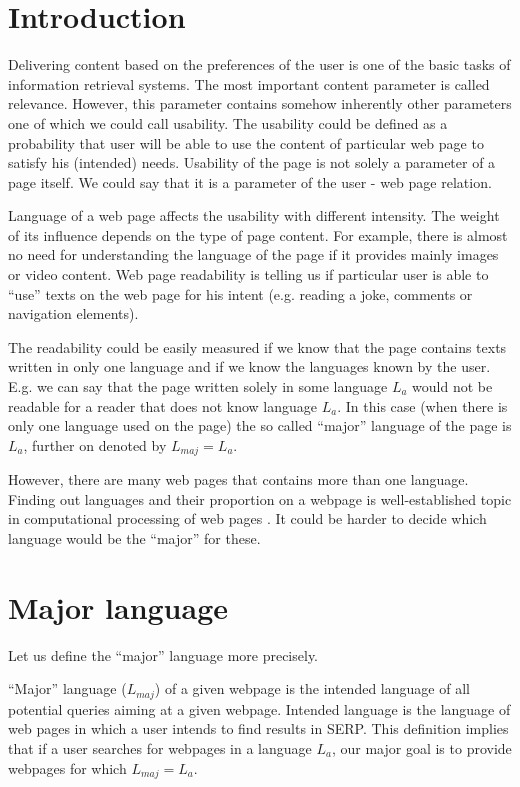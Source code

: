 \documentclass{acm_proc_article-sp}
\begin{document}
\section{Introduction}
  Delivering content based on the preferences of the user is one of the basic tasks of information retrieval systems.
  The most important content parameter is called relevance. 
  However, this parameter contains somehow inherently other parameters one of which we could call usability.
  The usability could be defined as a probability that user will be able to use the content of particular 
  web page to satisfy his (intended) needs.
  Usability of the page is not solely a parameter of a page itself.
  We could say that it is a parameter of the user - web page relation.

  Language of a web page affects the usability with different intensity. 
  The weight of its influence depends on the type of page content.
  For example, there is almost no need for understanding the language of the page if it provides mainly images or video content.
  Web page readability is telling us if particular user is able to
  ``use'' texts on the web page for his intent (e.g. reading a joke, comments or navigation elements).
 

  The readability could be easily measured if we know that the page contains texts written in only one language 
  and if we know the languages known by the user.
  E.g. we can say that the page written solely in some language $L_a$ would not be readable for a reader 
  that does not know language $L_a$. 
  In this case (when there is only one language used on the page) 
  the so called ``major'' language of the page is $L_a$, further on denoted by $L_{maj} = L_a$.
  
  However, there are many web pages that contains more than one language.
  Finding out languages and their proportion on a webpage is well-established topic in computational processing of 
  web pages \cite{ Baldwin:shortlong, Campbell:supportvector, trenkle:ngram, Martins:langidentweb, Rehurek:languageidentification}.
  It could be harder to decide which language would be the ``major'' for these.
 
  \section{Major language}
  
  Let us define the ``major'' language more precisely. 
  
  ``Major'' language ($L_{maj}$) of a given webpage is the intended language of all potential queries aiming at a given webpage.
  Intended language is the language of web pages in which a user intends to find results in SERP. 
  This definition implies that if a user searches for webpages in a language $L_a$, 
  our major goal is to provide webpages for which $L_{maj} = L_a$.
  
\end{document}
